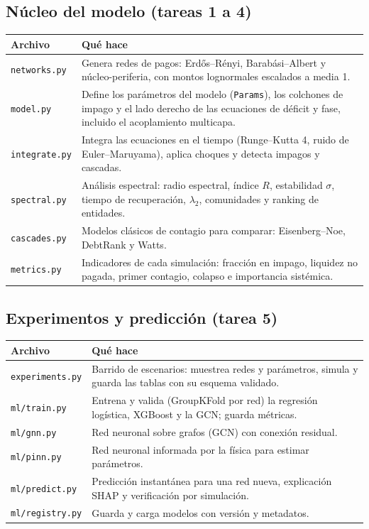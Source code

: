 \subsection*{Núcleo del modelo (tareas 1 a 4)}
\begin{longtable}{L{0.24\textwidth}L{0.68\textwidth}}
\toprule
\textbf{Archivo} & \textbf{Qué hace} \\
\midrule
\endhead
\texttt{networks.py} & Genera redes de pagos: Erdős–Rényi, Barabási–Albert y
núcleo-periferia, con montos lognormales escalados a media 1. \\
\texttt{model.py} & Define los parámetros del modelo (\texttt{Params}), los colchones
de impago y el lado derecho de las ecuaciones de déficit y fase, incluido el
acoplamiento multicapa. \\
\texttt{integrate.py} & Integra las ecuaciones en el tiempo (Runge–Kutta 4, ruido de
Euler–Maruyama), aplica choques y detecta impagos y cascadas. \\
\texttt{spectral.py} & Análisis espectral: radio espectral, índice $R$, estabilidad
$\sigma$, tiempo de recuperación, $\lambda_2$, comunidades y ranking de entidades. \\
\texttt{cascades.py} & Modelos clásicos de contagio para comparar: Eisenberg–Noe,
DebtRank y Watts. \\
\texttt{metrics.py} & Indicadores de cada simulación: fracción en impago, liquidez no
pagada, primer contagio, colapso e importancia sistémica. \\
\bottomrule
\end{longtable}

\subsection*{Experimentos y predicción (tarea 5)}
\begin{longtable}{L{0.24\textwidth}L{0.68\textwidth}}
\toprule
\textbf{Archivo} & \textbf{Qué hace} \\
\midrule
\endhead
\texttt{experiments.py} & Barrido de escenarios: muestrea redes y parámetros, simula y
guarda las tablas con su esquema validado. \\
\texttt{ml/train.py} & Entrena y valida (GroupKFold por red) la regresión logística,
XGBoost y la GCN; guarda métricas. \\
\texttt{ml/gnn.py} & Red neuronal sobre grafos (GCN) con conexión residual. \\
\texttt{ml/pinn.py} & Red neuronal informada por la física para estimar parámetros. \\
\texttt{ml/predict.py} & Predicción instantánea para una red nueva, explicación SHAP y
verificación por simulación. \\
\texttt{ml/registry.py} & Guarda y carga modelos con versión y metadatos. \\
\bottomrule
\end{longtable}

